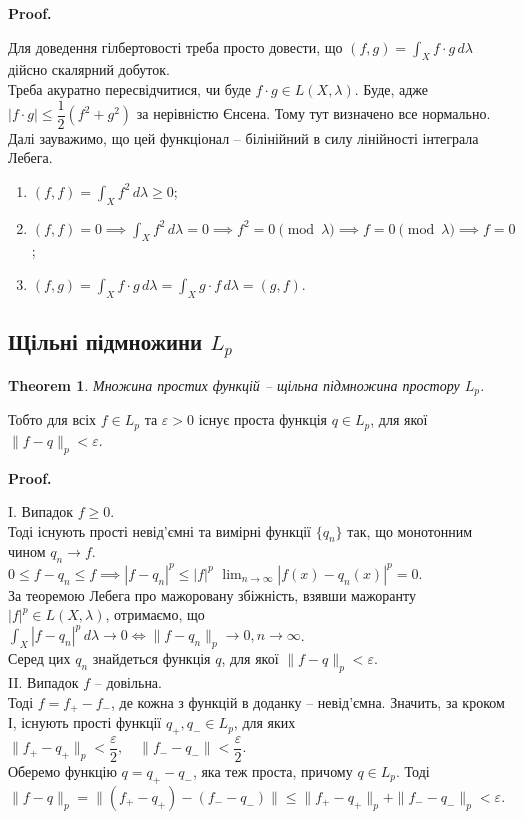 \documentclass[a4paper, 10pt]{article}
\makeatletter
\theoremstyle{theoremdd}
\newtheorem{theorem}{Theorem}[subsection]
\renewenvironment{proof}[1][Proof.\\]{\par
\pushQED{\hfill \qed}%
\normalfont \topsep6\p@\@plus6\p@\relax
\trivlist
\item\relax
{\bfseries
#1\@addpunct{.}}\hspace\labelsep\ignorespaces
}{%
\popQED\endtrivlist\@endpefalse
}
\makeatother
\begin{document}
\begin{proof}
Для доведення гілбертовості треба просто довести, що $(f,g) = \displaystyle\int_X f \cdot g\,d\lambda$ дійсно скалярний добуток.\\
Треба акуратно пересвідчитися, чи буде $f \cdot g \in L(X,\lambda)$. Буде, адже $|f \cdot g| \leq \dfrac{1}{2}(f^2 + g^2)$ за нерівністю Єнсена. Тому тут визначено все нормально.\\
Далі зауважимо, що цей функціонал -- білінійний в силу лінійності інтеграла Лебега.
\begin{enumerate}[nosep,wide=0pt,label={\arabic*)}]
\item $(f,f) = \displaystyle\int_X f^2\,d\lambda \geq 0$;
\item $(f,f) = 0 \implies \displaystyle\int_X f^2\,d\lambda = 0 \implies f^2 = 0 \pmod \lambda \implies f = 0 \pmod \lambda \implies f = 0$;
\item $(f,g) = \displaystyle\int_X f \cdot g\,d\lambda = \int_X g \cdot f\,d\lambda = (g,f)$.
\end{enumerate}
\end{proof}

\subsection{Щільні підмножини $L_p$}
\begin{theorem}
Множина простих функцій -- щільна підмножина простору $L_p$.
\end{theorem}
\noindent
Тобто для всіх $f \in L_p$ та $\varepsilon > 0$ існує проста функція $q \in L_p$, для якої $\|f-q\|_p < \varepsilon$.

\begin{proof}
I. Випадок $f \geq 0$.\\
Тоді існують прості невід'ємні та вимірні функції $\{q_n\}$ так, що монотонним чином $q_n \to f$.\\
$0 \leq f - q_n \leq f \implies |f-q_n|^p \leq |f|^p$ \qquad $\displaystyle\lim_{n \to \infty} |f(x) - q_n(x)|^p = 0$.\\
За теоремою Лебега про мажоровану збіжність, взявши мажоранту $|f|^p \in L(X,\lambda)$, отримаємо, що\\
$\displaystyle\int_X |f-q_n|^p\,d\lambda \to 0 \iff \|f-q_n\|_p \to 0, n \to \infty$.\\
Серед цих $q_n$ знайдеться функція $q$, для якої $\|f-q\|_p < \varepsilon$.
\bigskip \\
II. Випадок $f$ -- довільна.\\
Тоді $f = f_+ - f_-$, де кожна з функцій в доданку -- невід'ємна. Значить, за кроком І, існують прості функції $q_+,q_- \in L_p$, для яких $\|f_+ - q_+\|_p < \dfrac{\varepsilon}{2}, \quad \|f_- - q_-\| < \dfrac{\varepsilon}{2}$.\\
Оберемо функцію $q = q_+ - q_-$, яка теж проста, причому $q \in L_p$. Тоді\\
$\|f-q\|_p = \| (f_+ - q_+) - (f_- - q_-)\| \leq \|f_+-q_+\|_p + \|f_- - q_-\|_p < \varepsilon$.
\end{proof}
\end{document}
